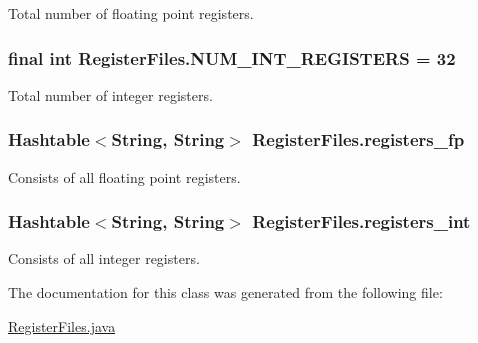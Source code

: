 Total number of floating point registers. 

\hypertarget{classRegisterFiles_acddf439e364d3aae0d80304b9a48cddc}{
\subsubsection[{NUM\_\-INT\_\-REGISTERS}]{\setlength{\rightskip}{0pt plus 5cm}final int {\bf RegisterFiles.NUM\_\-INT\_\-REGISTERS} = 32}}
\label{classRegisterFiles_acddf439e364d3aae0d80304b9a48cddc}


Total number of integer registers. 

\hypertarget{classRegisterFiles_a745f9139c6fa19ec3e13bef143ccf6ec}{
\subsubsection[{registers\_\-fp}]{\setlength{\rightskip}{0pt plus 5cm}Hashtable$<$String, String$>$ {\bf RegisterFiles.registers\_\-fp}}}
\label{classRegisterFiles_a745f9139c6fa19ec3e13bef143ccf6ec}


Consists of all floating point registers. 

\hypertarget{classRegisterFiles_a9a9b1e074fab69ab6201b5a06f8eaaa6}{
\subsubsection[{registers\_\-int}]{\setlength{\rightskip}{0pt plus 5cm}Hashtable$<$String, String$>$ {\bf RegisterFiles.registers\_\-int}}}
\label{classRegisterFiles_a9a9b1e074fab69ab6201b5a06f8eaaa6}


Consists of all integer registers. 



The documentation for this class was generated from the following file:\begin{DoxyCompactItemize}
\item 
\hyperlink{RegisterFiles_8java}{RegisterFiles.java}\end{DoxyCompactItemize}
